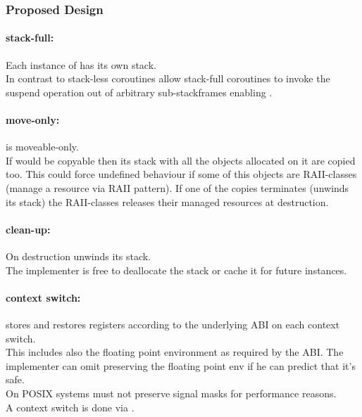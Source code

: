 
\subsubsection*{Proposed Design}

\paragraph*{stack-full:}
Each instance of \coro has its own stack.\\
\newline
In contrast to stack-less coroutines allow stack-full coroutines to invoke the
suspend operation out of arbitrary sub-stackframes enabling \escreops.

\paragraph*{move-only:}
\coro is moveable-only.\\
\newline
If \coro would be copyable then its stack with all the objects allocated on it
are copied too. This could force undefined behaviour if some of this objects are
RAII-classes (manage a resource via RAII pattern). If one of the \coro copies
terminates (unwinds its stack) the RAII-classes releases their managed resources
at destruction.

\paragraph*{clean-up:}
On destruction \coro unwinds its stack.\\
\newline
The implementer is free to deallocate the stack or cache it for future \coro
instances.

\paragraph*{context switch:}
\coro stores and restores registers according to the underlying ABI on each
context switch.\\
\newline
This includes also the floating point environment as required by the ABI. The
implementer can omit preserving the floating point env if he can predict that
it's safe.\\
\newline
On POSIX systems \coro must not preserve signal masks for performance reasons.\\
\newline
A context switch is done via \coroop.


